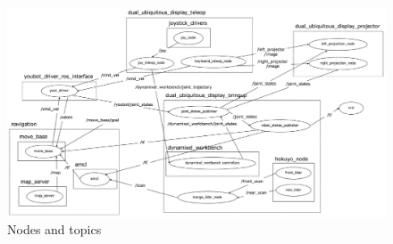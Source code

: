 \documentclass[12pt]{sonota/aislab}
\begin{document}

\begin{figure}[t]
\begin{center}
\includegraphics[clip, width=18cm, angle=90]{figs/dud_rqt_graph.eps}
\caption{Nodes and topics}
\label{rqt}
\end{center}
\end{figure}
\end{document}
